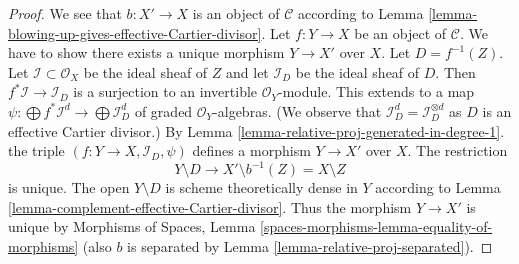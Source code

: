 \begin{proof}
We see that $b : X' \to X$ is an object of $\mathcal{C}$ according to
Lemma \ref{lemma-blowing-up-gives-effective-Cartier-divisor}.
Let $f : Y \to X$ be an object of $\mathcal{C}$. We have to show there exists
a unique morphism $Y \to X'$ over $X$. Let $D = f^{-1}(Z)$.
Let $\mathcal{I} \subset \mathcal{O}_X$ be the ideal sheaf of $Z$
and let $\mathcal{I}_D$ be the ideal sheaf of $D$. Then
$f^*\mathcal{I} \to \mathcal{I}_D$ is a surjection
to an invertible $\mathcal{O}_Y$-module. This extends to a map
$\psi : \bigoplus f^*\mathcal{I}^d \to \bigoplus \mathcal{I}_D^d$
of graded $\mathcal{O}_Y$-algebras. (We observe that
$\mathcal{I}_D^d = \mathcal{I}_D^{\otimes d}$ as $D$ is an
effective Cartier divisor.) By
Lemma \ref{lemma-relative-proj-generated-in-degree-1}.
the triple $(f : Y \to X, \mathcal{I}_D, \psi)$ defines a
morphism $Y \to X'$ over $X$. The restriction
$$
Y \setminus D \longrightarrow X' \setminus b^{-1}(Z) = X \setminus Z
$$
is unique. The open $Y \setminus D$ is scheme theoretically dense in $Y$
according to Lemma \ref{lemma-complement-effective-Cartier-divisor}. 
Thus the morphism $Y \to X'$ is unique by
Morphisms of Spaces, Lemma \ref{spaces-morphisms-lemma-equality-of-morphisms}
(also $b$ is separated by Lemma
\ref{lemma-relative-proj-separated}).
\end{proof}















